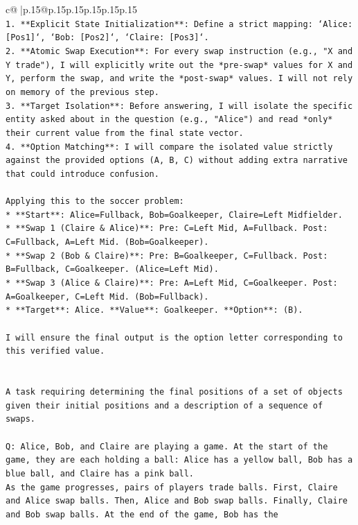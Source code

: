 \documentclass{article}
\begin{document}
{\begin{supertabular}{c@{$\;$}|p{.15\linewidth}@{}p{.15\linewidth}p{.15\linewidth}p{.15\linewidth}p{.15\linewidth}p{.15\linewidth}}
{{{\\ 
\texttt{1.  **Explicit State Initialization**: Define a strict mapping: `Alice: {[}Pos1{]}`, `Bob: {[}Pos2{]}`, `Claire: {[}Pos3{]}`.} \\
\texttt{2.  **Atomic Swap Execution**: For every swap instruction (e.g., "X and Y trade"), I will explicitly write out the *pre{-}swap* values for X and Y, perform the swap, and write the *post{-}swap* values. I will not rely on memory of the previous step.} \\
\texttt{3.  **Target Isolation**: Before answering, I will isolate the specific entity asked about in the question (e.g., "Alice") and read *only* their current value from the final state vector.} \\
\texttt{4.  **Option Matching**: I will compare the isolated value strictly against the provided options (A, B, C) without adding extra narrative that could introduce confusion.} \\
\\ 
\texttt{Applying this to the soccer problem:} \\
\texttt{*   **Start**: Alice=Fullback, Bob=Goalkeeper, Claire=Left Midfielder.} \\
\texttt{*   **Swap 1 (Claire \& Alice)**: Pre: C=Left Mid, A=Fullback. Post: C=Fullback, A=Left Mid. (Bob=Goalkeeper).} \\
\texttt{*   **Swap 2 (Bob \& Claire)**: Pre: B=Goalkeeper, C=Fullback. Post: B=Fullback, C=Goalkeeper. (Alice=Left Mid).} \\
\texttt{*   **Swap 3 (Alice \& Claire)**: Pre: A=Left Mid, C=Goalkeeper. Post: A=Goalkeeper, C=Left Mid. (Bob=Fullback).} \\
\texttt{*   **Target**: Alice. **Value**: Goalkeeper. **Option**: (B).} \\
\\ 
\texttt{I will ensure the final output is the option letter corresponding to this verified value.} \\
\\ 
\\ 
\texttt{A task requiring determining the final positions of a set of objects given their initial positions and a description of a sequence of swaps.} \\
\\ 
\texttt{Q: Alice, Bob, and Claire are playing a game. At the start of the game, they are each holding a ball: Alice has a yellow ball, Bob has a blue ball, and Claire has a pink ball.} \\
\texttt{As the game progresses, pairs of players trade balls. First, Claire and Alice swap balls. Then, Alice and Bob swap balls. Finally, Claire and Bob swap balls. At the end of the game, Bob has the} \\
}}}
\end{supertabular}}
\end{document}
